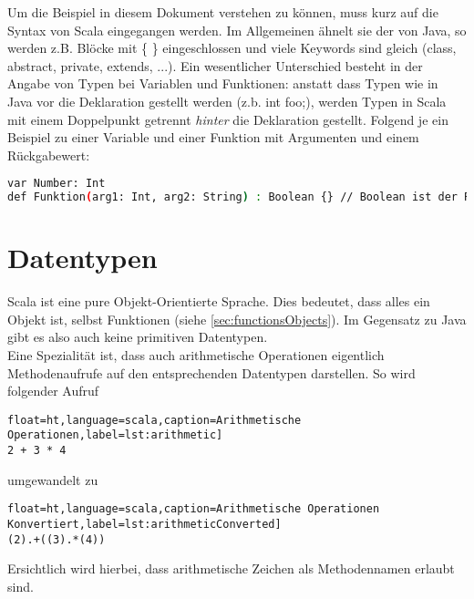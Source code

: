 Um die Beispiel in diesem Dokument verstehen zu können, muss kurz auf
die Syntax von Scala eingegangen werden. Im Allgemeinen ähnelt sie der
von Java, so werden z.B. Blöcke mit \{ \} eingeschlossen und viele
Keywords sind gleich (class, abstract, private, extends, ...).
Ein wesentlicher Unterschied besteht in der Angabe von Typen bei Variablen
und Funktionen: anstatt dass Typen wie in Java vor die Deklaration gestellt
werden (z.b. int foo;), werden Typen in Scala mit einem Doppelpunkt getrennt
\emph{hinter} die Deklaration gestellt. Folgend je ein Beispiel zu einer Variable
und einer Funktion mit Argumenten und einem Rückgabewert:

\begin{lstlisting}[float=ht,language=bash,caption=Typenangabe,label=lst:types]
var Number: Int
def Funktion(arg1: Int, arg2: String) : Boolean {} // Boolean ist der Rueckgabewert
\end{lstlisting}


\section{Datentypen}
\label{sec:datatypes}

Scala ist eine pure Objekt-Orientierte Sprache. Dies bedeutet, dass alles
ein Objekt ist, selbst Funktionen (siehe \ref{sec:functionsObjects}). Im
Gegensatz zu Java gibt es also auch keine primitiven Datentypen.\\

Eine Spezialität ist, dass auch arithmetische Operationen eigentlich
Methodenaufrufe auf den entsprechenden Datentypen darstellen. So wird
folgender Aufruf

\begin{lstlisting}float=ht,language=scala,caption=Arithmetische Operationen,label=lst:arithmetic]
2 + 3 * 4
\end{lstlisting}

umgewandelt zu
\begin{lstlisting}float=ht,language=scala,caption=Arithmetische Operationen Konvertiert,label=lst:arithmeticConverted]
(2).+((3).*(4))
\end{lstlisting}

Ersichtlich wird hierbei, dass arithmetische Zeichen
als Methodennamen erlaubt sind. \\


